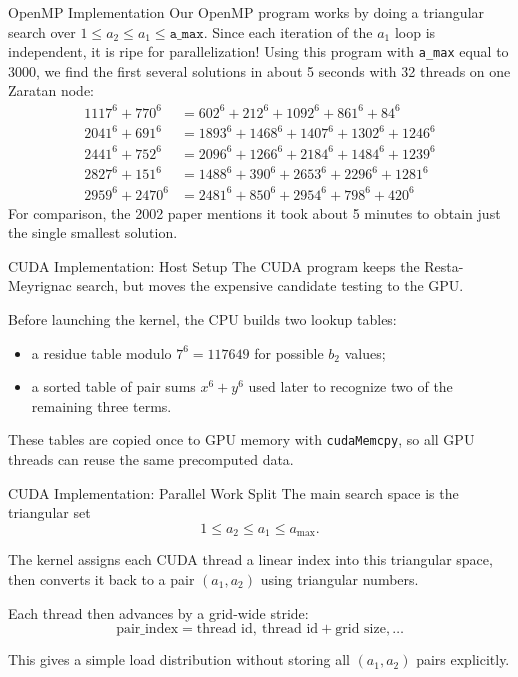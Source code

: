 \documentclass[]{beamer}
\begin{document}
\begin{frame}{OpenMP Implementation}
  Our OpenMP program works by doing a triangular search over $1 \leq a_2 \leq a_1 \leq \texttt{a\_max}$.
  \pause
  Since each iteration of the $a_1$ loop is independent, it is ripe for parallelization!
  \pause
  Using this program with \texttt{a\_max} equal to $3000$, we find the first several solutions in about 5 seconds with 32 threads on one Zaratan node:
  \pause
  \begin{align*}
    1117^6 + 770^6 &= 602^6 + 212^6 + 1092^6 + 861^6 + 84^6 \\
    2041^6 + 691^6 &= 1893^6 + 1468^6 + 1407^6 + 1302^6 + 1246^6 \\
    2441^6 + 752^6 &= 2096^6 + 1266^6 + 2184^6 + 1484^6 + 1239^6 \\
    2827^6 + 151^6 &= 1488^6 + 390^6 + 2653^6 + 2296^6 + 1281^6 \\
    2959^6 + 2470^6 &= 2481^6 + 850^6 + 2954^6 + 798^6 + 420^6
  \end{align*}
  \pause
  For comparison, the 2002 paper mentions it took about 5 minutes to obtain just the single smallest solution.
\end{frame}

\begin{frame}{CUDA Implementation: Host Setup}
  The CUDA program keeps the Resta-Meyrignac search, but moves the expensive
  candidate testing to the GPU.
  \pause
  \bigskip

  Before launching the kernel, the CPU builds two lookup tables:
  \begin{itemize}
    \item a residue table modulo $7^6 = 117649$ for possible $b_2$ values;
    \item a sorted table of pair sums $x^6 + y^6$ used later to recognize
      two of the remaining three terms.
  \end{itemize}
  \pause

  These tables are copied once to GPU memory with \texttt{cudaMemcpy}, so all
  GPU threads can reuse the same precomputed data.
\end{frame}

\begin{frame}{CUDA Implementation: Parallel Work Split}
  The main search space is the triangular set
  \begin{equation*}
    1 \leq a_2 \leq a_1 \leq a_{\max}.
  \end{equation*}
  \pause

  The kernel assigns each CUDA thread a linear index into this triangular
  space, then converts it back to a pair $(a_1,a_2)$ using triangular numbers.
  \pause
  \bigskip

  Each thread then advances by a grid-wide stride:
  \begin{equation*}
    \text{pair\_index} =
    \text{thread id},\ \text{thread id} + \text{grid size},\ldots
  \end{equation*}
  \pause

  This gives a simple load distribution without storing all $(a_1,a_2)$ pairs
  explicitly.
\end{frame}
\end{document}
